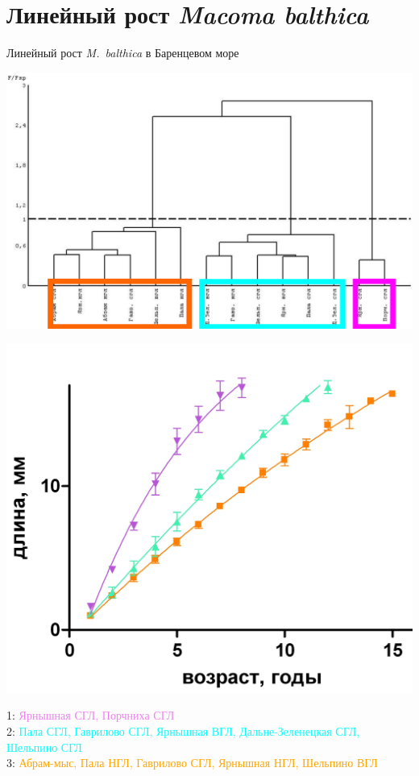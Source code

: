\documentclass{beamer}
\begin{document}
		\section[Линейный рост]{Линейный рост {\it Macoma balthica}}
\begin{frame}{Линейный рост {\it M.~balthica} в Баренцевом море}
	\begin{minipage}[t]{.58\linewidth}
		\begin{center}
			\includegraphics[width=\textwidth]{./dendrogramma_sravnenie_rosta_linear_all_gorizonts.pdf}
		\end{center}
	\end{minipage}
%
	\begin{minipage}[t]{.4\linewidth}
		\begin{center}
			\includegraphics[width=\textwidth]{./rost_clusters_all_crop.jpg}
		\end{center}
	\end{minipage}

1: \textcolor{violet}{Ярнышная СГЛ, Порчниха СГЛ}\\
2: \textcolor{cyan}{Пала СГЛ, Гаврилово СГЛ, Ярнышная ВГЛ, Дальне-Зеленецкая СГЛ, Шельпино СГЛ}\\
3: \textcolor{orange}{Абрам-мыс, Пала НГЛ, Гаврилово СГЛ, Ярнышная НГЛ, Шельпино ВГЛ}
\end{frame}
\end{document}

